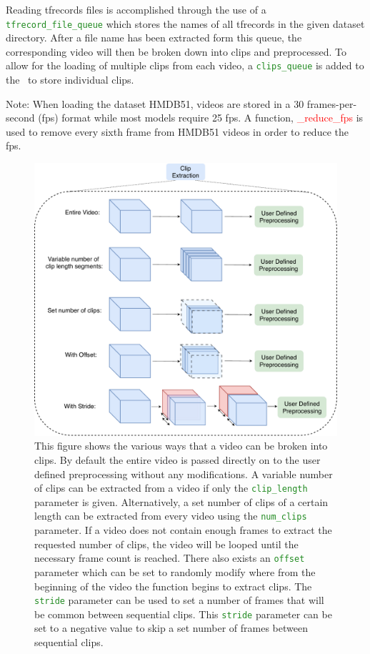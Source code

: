 \documentclass{llncs}
\begin{document}
Reading tfrecords files is accomplished through the use of a \texttt{\textcolor{ForestGreen}{tfrecord\_file\-\_queue}} which stores the names of all tfrecords in the given dataset directory.
After a file name has been extracted form this queue, the corresponding video will then be broken down into clips and preprocessed.
To allow for the loading of multiple clips from each video, a \texttt{\textcolor{ForestGreen}{clips\_queue}} is added to the \data~to store individual clips.

Note: When loading the dataset HMDB51, videos are stored in a 30 frames-per-second (fps) format while most models require 25 fps. A function, \textcolor{red}{\_reduce\_fps} is used to remove every sixth frame from HMDB51 videos in order to reduce the fps.


\begin{figure}[t!]
\centering
\includegraphics[width=0.8\columnwidth]{images/extract_clips.pdf}
\caption{This figure shows the various ways that a video can be broken into clips.
By default the entire video is passed directly on to the user defined preprocessing without any modifications.
A variable number of clips can be extracted from a video if only the \texttt{\textcolor{ForestGreen}{clip\_length}} parameter is given.
Alternatively, a set number of clips of a certain length can be extracted from every video using the \texttt{\textcolor{ForestGreen}{num\_clips}} parameter.
If a video does not contain enough frames to extract the requested number of clips, the video will be looped until the necessary frame count is reached.
There also exists an \texttt{\textcolor{ForestGreen}{offset}} parameter which can be set to randomly modify where from the beginning of the video the function begins to extract clips. 
The \texttt{\textcolor{ForestGreen}{stride}}  parameter can be used to set a number of frames that will be common between sequential clips.
This \texttt{\textcolor{ForestGreen}{stride}} parameter can be set to a negative value to skip a set number of frames between sequential clips.
}
\label{fig:extract_clips}
\end{figure}
\end{document}
